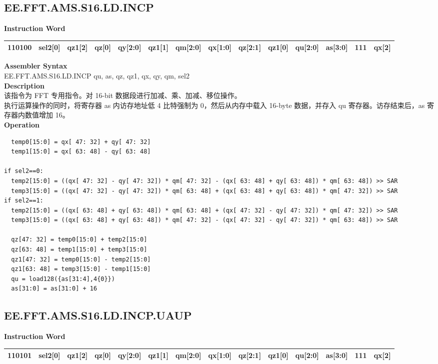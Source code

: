 \clearpage
\subsection{EE.FFT.AMS.S16.LD.INCP}\label{instruction:EEFFTAMSS16LDINCP}
\setlength\tabcolsep{5pt}
\textbf{Instruction Word} \\
\begin{tabular}{|c|c|c|c|c|c|c|c|c|c|c|c|c|c|}
	\hline
	110100 & sel2[0] & qz1[2] & qz[0] & qy[2:0] & qz1[1] & qm[2:0] & qx[1:0] & qz[2:1] & qz1[0] & qu[2:0] & as[3:0] & 111 & qx[2] \\
	\hline
\end{tabular}

\textbf{Assembler Syntax} \\
EE.FFT.AMS.S16.LD.INCP qu, as, qz, qz1, qx, qy, qm, sel2 \\
\textbf{Description} \\
该指令为 FFT 专用指令。对 16-bit 数据段进行加减、乘、加减、移位操作。\\
执行运算操作的同时，将寄存器 as 内访存地址低 4 比特强制为 0，然后从内存中载入 16-byte 数据，并存入 qu 寄存器。访存结束后，as 寄存器内数值增加 16。\\
\textbf{Operation}
\begin{lstlisting}
  temp0[15:0] = qx[ 47: 32] + qy[ 47: 32]
  temp1[15:0] = qx[ 63: 48] - qy[ 63: 48]

if sel2==0:
  temp2[15:0] = ((qx[ 47: 32] - qy[ 47: 32]) * qm[ 47: 32] - (qx[ 63: 48] + qy[ 63: 48]) * qm[ 63: 48]) >> SAR
  temp3[15:0] = ((qx[ 47: 32] - qy[ 47: 32]) * qm[ 63: 48] + (qx[ 63: 48] + qy[ 63: 48]) * qm[ 47: 32]) >> SAR
if sel2==1:
  temp2[15:0] = ((qx[ 63: 48] + qy[ 63: 48]) * qm[ 63: 48] + (qx[ 47: 32] - qy[ 47: 32]) * qm[ 47: 32]) >> SAR
  temp3[15:0] = ((qx[ 63: 48] + qy[ 63: 48]) * qm[ 47: 32] - (qx[ 47: 32] - qy[ 47: 32]) * qm[ 63: 48]) >> SAR

  qz[47: 32] = temp0[15:0] + temp2[15:0]
  qz[63: 48] = temp1[15:0] + temp3[15:0]
  qz1[47: 32] = temp0[15:0] - temp2[15:0]
  qz1[63: 48] = temp3[15:0] - temp1[15:0]
  qu = load128({as[31:4],4{0}})
  as[31:0] = as[31:0] + 16
\end{lstlisting}

\clearpage
\subsection{EE.FFT.AMS.S16.LD.INCP.UAUP}\label{instruction:EEFFTAMSS16LDINCPUAUP}
\setlength\tabcolsep{5pt}
\textbf{Instruction Word} \\
\begin{tabular}{|c|c|c|c|c|c|c|c|c|c|c|c|c|c|}
	\hline
	110101 & sel2[0] & qz1[2] & qz[0] & qy[2:0] & qz1[1] & qm[2:0] & qx[1:0] & qz[2:1] & qz1[0] & qu[2:0] & as[3:0] & 111 & qx[2] \\
	\hline
\end{tabular}

